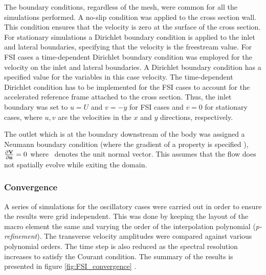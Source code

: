  The boundary conditions, regardless of the mesh, were common for all the simulations performed. A no-slip condition was applied to the cross section wall. This condition ensures that the velocity is zero at the surface of the cross section. For stationary simulations a Dirichlet boundary condition is applied to the inlet and lateral boundaries, specifying that the velocity is the freestream value. For FSI cases a time-dependent Dirichlet boundary condition was employed for the velocity on the inlet and lateral boundaries. A Dirichlet boundary condition has a specified value for the variables \citep{kreyszig2010} in this case velocity. The time-dependent Dirichlet condition has to be implemented for the FSI cases to account for the accelerated reference frame attached to the cross section. Thus, the inlet boundary was set to $u=U$ and $v=-\dot{y}$ for FSI cases and $v=0$ for stationary cases, where $u,v$ are the velocities in the $x$ and $y$ directions, respectively.
 
 The outlet which is at the boundary downstream of the body was assigned a Neumann boundary condition (where the gradient of a property is specified \citet{tu2007}), $\frac{\partial\mathbf{V}}{\partial\mathbf{n}}=0$ where \normal\ denotes the unit normal vector. This assumes that the flow does not spatially evolve while exiting the domain.

\subsubsection{Convergence}

A series of simulations for the oscillatory cases were carried out in order to ensure the results were grid independent. This was done by keeping the layout of the macro element the same and varying the order of the interpolation polynomial (\emph{p-refinement}). The transverse velocity amplitudes were compared against various polynomial orders. The time step is also reduced as the spectral resolution increases to satisfy the Courant condition. The summary of the results is presented in figure \ref{fig:FSI_convergence} .



